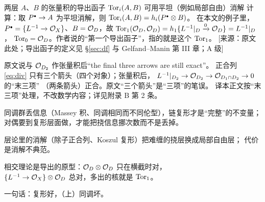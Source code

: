 \begin{yizhu}
两层 $A$、$B$ 的张量积的导出函子 $\operatorname{Tor}_i(A,B)$ 可用平坦（例如局部自由）消解
计算：取 $P^{\scriptscriptstyle\bullet}\to A$ 为平坦消解，则 $\operatorname{Tor}_i(A,B)=h_i(P^{\scriptscriptstyle\bullet}\otimes B)$。
在本文的例子里，$P^{\scriptscriptstyle\bullet}=\{L^{-1}\to\mathcal{O}_X\}$、$B=\mathcal{O}_D$，故
$\operatorname{Tor}_1(\mathcal{O}_D,\mathcal{O}_D)=h_1\{L^{-1}\arrowvert_D\xrightarrow{0}\mathcal{O}_D\}=L^{-1}\arrowvert_D$，
$\operatorname{Tor}_0=\mathcal{O}_D$。作者说的“第一个导出函子”，指的就是这个 $\operatorname{Tor}_1$。
[来源：原文此处；导出函子的定义见 §\ref{sec:df} 与 Gelfand--Manin 第 III 章；A 级]
\end{yizhu}

\begin{kanwu}
原文说与 $\mathcal{O}_{D_2}$ 作张量积后“the final three arrows are still exact”。
正合列 \eqref{eq:div} 只有三个箭头（四个对象）；张量积后，
$L^{-1}\arrowvert_{D_2}\to\mathcal{O}_{D_2}\to\mathcal{O}_{D_1\cap D_2}\to0$ 的“末三项”
（两条箭头）正合。原文“三个箭头”是“三项”的笔误。
译本正文按“末三项”处理，不改数学内容；详见附录 B 第 2 条。
\end{kanwu}

\begin{keytakeaways}
\item 同调群丢信息（Massey 积、同调相同而不同伦型），链复形才是“完整”的不变量；
  对偶要到复形层面做，才能把挠信息挪次数而不是丢掉。
\item 层论里的消解（除子正合列、Koszul 复形）把难缠的挠层换成局部自由层；
  代价是消解不典范。
\item 相交理论是导出的原型：$\mathcal{O}_D\otimes\mathcal{O}_D$ 只在横截时对，\\
  $\{L^{-1}\to\mathcal{O}_X\}\otimes\mathcal{O}_{D}$ 总对，多出的核就是 $\operatorname{Tor}_1$。
\item 一句话：复形好，（上）同调坏。
\end{keytakeaways}
